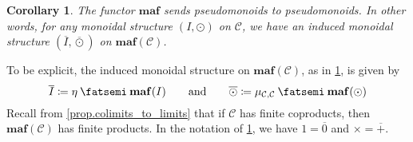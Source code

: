 \documentclass[11pt, one side, article]{memoir}
\theoremstyle{definition}
\theoremstyle{plain}
\newtheorem{corollary}[definitionx]{Corollary}
\newcommand{\cat}[1]{\mathcal{#1}}%
\newcommand{\Cat}[1]{\mathbf{#1}}%
\newcommand{\then}{\mathbin{\fatsemi}}
\newcommand{\ol}[1]{\overline{#1}}
\newcommand{\0}{\Cat{0}}
\newcommand{\1}{\Cat{1}}
\newcommand{\olodot}{\mathbin{\ol{\odot}}}
\newcommand{\opfam}{\Cat{maf}}
\newcommand{\qqand}{\qquad\text{and}\qquad}
\begin{document}
\begin{corollary}\label{cor.induced_monoidal}
The functor $\opfam$ sends pseudomonoids to pseudomonoids. In other words, for any monoidal structure $(I,\odot)$ on $\cat{C}$, we have an induced monoidal structure $(\ol{I},\olodot)$ on $\opfam(\cat{C})$.
\end{corollary}

To be explicit, the induced monoidal structure on $\opfam(\cat{C})$, as in \cref{cor.induced_monoidal}, is given by
\[
\ol{I}\coloneqq\eta\then\opfam(I)
\qqand
\olodot\coloneqq\mu_{\cat{C},\cat{C}}\then\opfam(\odot)
\]
Recall from \cref{prop.colimits_to_limits} that if $\cat{C}$ has finite coproducts, then $\opfam(\cat{C})$ has finite products. In the notation of \cref{cor.induced_monoidal}, we have $1=\ol{0}$ and $\times=\ol{+}$.
\end{document}
